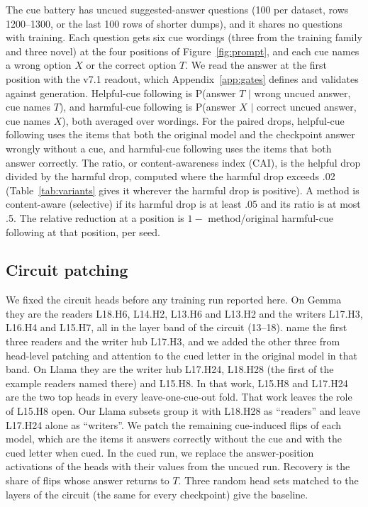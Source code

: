 \documentclass[11pt]{article}
\newcommand{\gemma}{Gemma}\newcommand{\gemmafull}{Gemma-2-2B-it}
\newcommand{\llama}{Llama}\newcommand{\llamafull}{Llama-3.1-8B-Instruct}
\begin{document}
The cue battery has \vGemGenNItems{} uncued suggested-answer questions (100 per dataset, rows 1200--1300, or the last 100 rows of shorter dumps), and it shares no questions with training. Each question gets six cue wordings (three from the training family and three novel) at the four positions of Figure~\ref{fig:prompt}, and each cue names a wrong option $X$ or the correct option $T$. We read the answer at the first position with the v7.1 readout, which Appendix~\ref{app:gates} defines and validates against generation. Helpful-cue following is P(answer $T$ $\mid$ wrong uncued answer, cue names $T$), and harmful-cue following is P(answer $X$ $\mid$ correct uncued answer, cue names $X$), both averaged over wordings. For the paired drops, helpful-cue following uses the items that both the original model and the checkpoint answer wrongly without a cue, and harmful-cue following uses the items that both answer correctly. The ratio, or content-awareness index (CAI), is the helpful drop divided by the harmful drop, computed where the harmful drop exceeds .02 (Table~\ref{tab:variants} gives it wherever the harmful drop is positive). A method is content-aware (selective) if its harmful drop is at least .05 and its ratio is at most .5. The relative reduction at a position is $1 -$ method/original harmful-cue following at that position, per seed.

\subsection{Circuit patching}
We fixed the circuit heads before any training run reported here. On \gemma{} they are the readers L18.H6, L14.H2, L13.H6 and L13.H2 and the writers L17.H3, L16.H4 and L15.H7, all in the layer band of the circuit (13--18). \citet{gupta2026many} name the first three readers and the writer hub L17.H3, and we added the other three from head-level patching and attention to the cued letter in the original model in that band. On \llama{} they are the writer hub L17.H24, L18.H28 (the first of the example readers named there) and L15.H8. In that work, L15.H8 and L17.H24 are the two top heads in every leave-one-cue-out fold. That work leaves the role of L15.H8 open. Our \llama{} subsets group it with L18.H28 as ``readers'' and leave L17.H24 alone as ``writers''. We patch the remaining cue-induced flips of each model, which are the items it answers correctly without the cue and with the cued letter when cued. In the cued run, we replace the answer-position activations of the heads with their values from the uncued run. Recovery is the share of flips whose answer returns to $T$. Three random head sets matched to the layers of the circuit (the same for every checkpoint) give the baseline.
\end{document}
